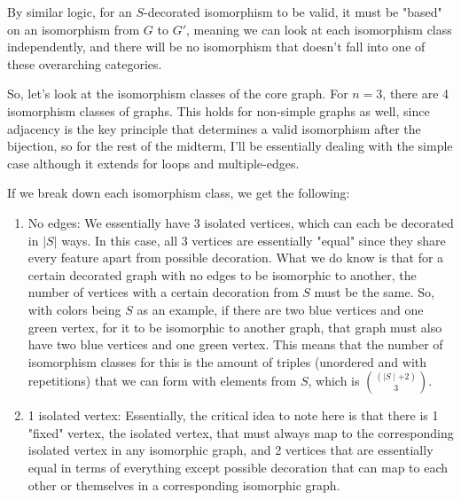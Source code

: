 \documentclass[11pt,reqno]{amsart}
\theoremstyle{definition}
\begin{document}
By similar logic, for an $S$-decorated isomorphism to be valid, it must be "based" on an isomorphism from $G$ to $G'$, meaning we can look at each isomorphism class independently, and there will be no isomorphism that doesn't fall into one of these overarching categories.

So, let's look at the isomorphism classes of the core graph. For $n = 3$, there are 4 isomorphism classes of graphs. This holds for non-simple graphs as well, since adjacency is the key principle that determines a valid isomorphism after the bijection, so for the rest of the midterm, I'll be essentially dealing with the simple case although it extends for loops and multiple-edges. 

If we break down each isomorphism class, we get the following:

\begin{enumerate}
    \item No edges: We essentially have 3 isolated vertices, which can each be decorated in $|S|$ ways. In this case, all 3 vertices are essentially "equal" since they share every feature apart from possible decoration. What we do know is that for a certain decorated graph with no edges to be isomorphic to another, the number of vertices with a certain decoration from $S$ must be the same. So, with colors being $S$ as an example, if there are two blue vertices and one green vertex, for it to be isomorphic to another graph, that graph must also have two blue vertices and one green vertex. This means that the number of isomorphism classes for this is the amount of triples (unordered and with repetitions) that we can form with elements from $S$, which is $(\mid S \mid + 2) \choose 3$.     

    \item 1 isolated vertex: Essentially, the critical idea to note here is that there is 1 "fixed" vertex, the isolated vertex, that must always map to the corresponding isolated vertex in any isomorphic graph, and 2 vertices that are essentially equal in terms of everything except possible decoration that can map to each other or themselves in a corresponding isomorphic graph.


\end{enumerate}
\end{document}
